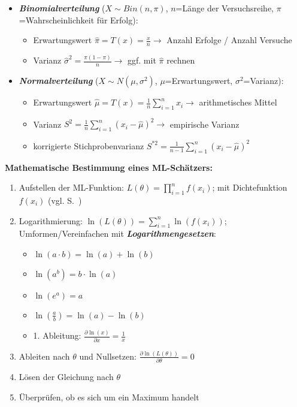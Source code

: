 \begin{itemize}
    \item \textbf{\emph{Binomialverteilung}} (\(X\sim Bin(n, \pi)\), \(n\)=Länge der Versuchsreihe, \(\pi\)=Wahrscheinlichkeit für Erfolg):
    \begin{itemize}
        \item Erwartungswert \(\hat{\pi}=T(x)=\frac{x}{n} \rightarrow \) Anzahl Erfolge / Anzahl Versuche
        \item Varianz \(\hat{\sigma}^2=\frac{\pi(1-\pi)}{n} \rightarrow \) ggf. mit \(\hat{\pi}\) rechnen
    \end{itemize}
    \item \textbf{\emph{Normalverteilung}} (\(X\sim N(\mu, \sigma^2)\), \(\mu\)=Erwartungswert, \(\sigma^2\)=Varianz):
    \begin{itemize}
        \item Erwartungswert \(\hat{\mu}=T(x)=\frac{1}{n}\sum_{i=1}^{n}x_i \rightarrow \) arithmetisches Mittel
        \item Varianz \(S^2=\frac{1}{n}\sum_{i=1}^{n}(x_i-\hat{\mu})^2 \rightarrow \) empirische Varianz
        \item korrigierte Stichprobenvarianz \(S^{*2}=\frac{1}{n-1}\sum_{i=1}^{n}(x_i-\hat{\mu})^2 \)
    \end{itemize}
\end{itemize}

\textbf{Mathematische Bestimmung eines ML-Schätzers:}

\begin{enumerate}
    \item Aufstellen der ML-Funktion: \(L(\theta)=\prod_{i=1}^{n}f(x_i)\); mit Dichtefunktion \(f(x_i)\) (vgl. S.~\pageref{verteilungen})
    \item Logarithmierung: \(\ln(L(\theta))=\sum_{i=1}^{n}\ln(f(x_i))\); Umformen/Vereinfachen mit \textbf{\emph{Logarithmengesetzen}}:
        \begin{itemize}
            \item \(\ln(a\cdot b)=\ln(a)+\ln(b)\)
            \item \(\ln(a^b)=b\cdot\ln(a)\)
            \item \(\ln(e^a)=a\)
            \item \(\ln(\frac{a}{b})=\ln(a)-\ln(b)\)
            \item 1. Ableitung: \(\frac{\partial \ln(x)}{\partial x} = \frac{1}{x}\)
        \end{itemize}
    \item Ableiten nach \(\theta\) und Nullsetzen: \(\frac{\partial \ln(L(\theta))}{\partial \theta}=0\)
    \item Lösen der Gleichung nach \(\theta\)
    \item Überprüfen, ob es sich um ein Maximum handelt
\end{enumerate}

